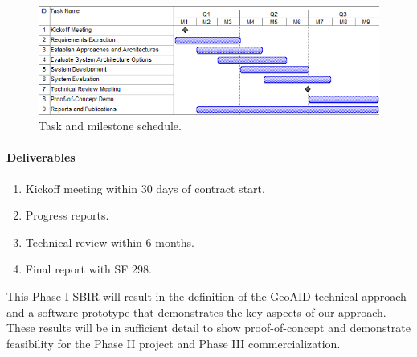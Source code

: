 \documentclass{sbir}
\begin{document}
\begin{figure}[h]
 \centerline{\includegraphics[width=5in]{./images/Gantt.png}}
 \caption{Task and milestone schedule.}
 \label{Gantt}
\end{figure}

\paragraph{Deliverables}
\begin{enumerate}[label=\alph*.] 
\vspace{-0.1in}
\item Kickoff meeting within 30 days of contract start.
\item Progress reports.
\item Technical review within 6 months.
\item Final report with SF 298.
\end{enumerate}


\newpage
{}

{This Phase I SBIR will result in the definition of the GeoAID technical approach and a software prototype that demonstrates the key aspects of our approach. These results will be in sufficient detail to show proof-of-concept and demonstrate feasibility for the Phase II project and Phase III commercialization.}
\end{document}
